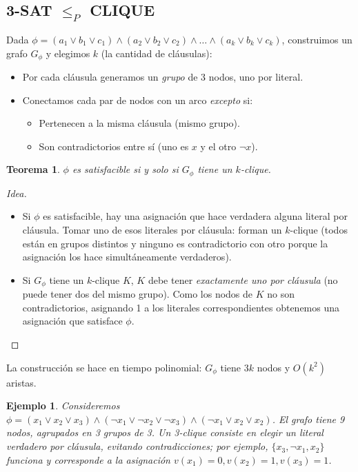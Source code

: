 \documentclass[11pt,a4paper]{article}
\theoremstyle{definicion}
\newtheorem{teorema}[definicion]{Teorema}
\newtheorem{ejemplo}[definicion]{Ejemplo}
\newcommand{\redP}{\leq_{P}}
\begin{document}
\subsection{3-SAT $\redP$ CLIQUE}

Dada $\phi = (a_1 \lor b_1 \lor c_1) \land (a_2 \lor b_2 \lor c_2) \land \dots \land (a_k \lor b_k \lor c_k)$, construimos un grafo $G_\phi$ y elegimos $k$ (la cantidad de cláusulas):

\begin{itemize}
    \item Por cada cláusula generamos un \emph{grupo} de 3 nodos, uno por literal.
    \item Conectamos cada par de nodos con un arco \emph{excepto} si:
    \begin{itemize}
        \item Pertenecen a la misma cláusula (mismo grupo).
        \item Son contradictorios entre sí (uno es $x$ y el otro $\neg x$).
    \end{itemize}
\end{itemize}

\begin{teorema}
$\phi$ es satisfacible si y solo si $G_\phi$ tiene un $k$-clique.
\end{teorema}

\begin{proof}[Idea]
\begin{itemize}
    \item Si $\phi$ es satisfacible, hay una asignación que hace verdadera alguna literal por cláusula. Tomar uno de esos literales por cláusula: forman un $k$-clique (todos están en grupos distintos y ninguno es contradictorio con otro porque la asignación los hace simultáneamente verdaderos).
    \item Si $G_\phi$ tiene un $k$-clique $K$, $K$ debe tener \emph{exactamente uno por cláusula} (no puede tener dos del mismo grupo). Como los nodos de $K$ no son contradictorios, asignando 1 a los literales correspondientes obtenemos una asignación que satisface $\phi$.
\end{itemize}
\end{proof}

La construcción se hace en tiempo polinomial: $G_\phi$ tiene $3k$ nodos y $O(k^2)$ aristas.

\begin{ejemplo}
Consideremos $\phi = (x_1 \lor x_2 \lor x_3) \land (\neg x_1 \lor \neg x_2 \lor \neg x_3) \land (\neg x_1 \lor x_2 \lor x_2)$. El grafo tiene 9 nodos, agrupados en 3 grupos de 3. Un 3-clique consiste en elegir un literal verdadero por cláusula, evitando contradicciones; por ejemplo, $\{x_3, \neg x_1, x_2\}$ funciona y corresponde a la asignación $v(x_1)=0, v(x_2)=1, v(x_3)=1$.
\end{ejemplo}
\end{document}
